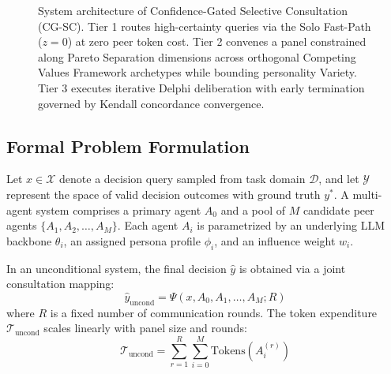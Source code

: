 \documentclass[conference]{IEEEtran}
\begin{document}
\begin{figure}[t]
{%
}
\caption{System architecture of Confidence-Gated Selective Consultation (CG-SC). Tier 1 routes high-certainty queries via the Solo Fast-Path ($z=0$) at zero peer token cost. Tier 2 convenes a panel constrained along Pareto Separation dimensions across orthogonal Competing Values Framework archetypes while bounding personality Variety. Tier 3 executes iterative Delphi deliberation with early termination governed by Kendall concordance convergence.}
\label{fig:architecture}
\end{figure}

\subsection{Formal Problem Formulation}
Let $x \in \mathcal{X}$ denote a decision query sampled from task domain $\mathcal{D}$, and let $\mathcal{Y}$ represent the space of valid decision outcomes with ground truth $y^*$. A multi-agent system comprises a primary agent $A_0$ and a pool of $M$ candidate peer agents $\{A_1, A_2, \dots, A_M\}$. Each agent $A_i$ is parametrized by an underlying LLM backbone $\theta_i$, an assigned persona profile $\phi_i$, and an influence weight $w_i$.

In an unconditional system, the final decision $\hat{y}$ is obtained via a joint consultation mapping:
\begin{equation}
\hat{y}_{\text{uncond}} = \Psi(x, A_0, A_1, \dots, A_M; R)
\end{equation}
where $R$ is a fixed number of communication rounds. The token expenditure $\mathcal{T}_{\text{uncond}}$ scales linearly with panel size and rounds:
\begin{equation}
\mathcal{T}_{\text{uncond}} = \sum_{r=1}^R \sum_{i=0}^M \text{Tokens}(A_i^{(r)})
\end{equation}
\end{document}

